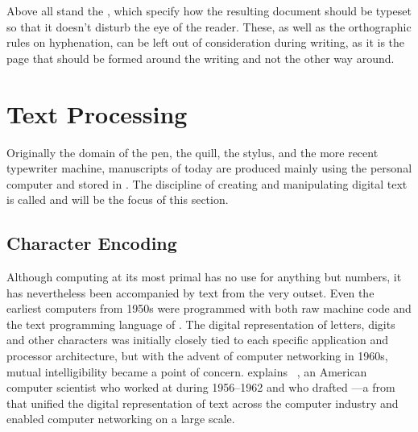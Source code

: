 Above all stand the ,
which specify how the resulting document should be typeset so that it doesn't
disturb the eye of the reader. These, as well as the orthographic rules on
hyphenation, can be left out of consideration during writing, as it is the page
that should be formed around the writing and not the other way around.

\section{Text Processing}
Originally the domain of the pen, the quill, the stylus, and the more recent
typewriter machine, manuscripts of today are produced mainly using the personal
computer and stored in . The discipline of creating and
manipulating digital text is called  and will be the focus
of this section.

\subsection{Character Encoding}
Although computing at its most primal has no use for anything but numbers, it
has nevertheless been accompanied by text from the very outset. Even the
earliest computers from 1950s were programmed with both raw machine code and
the text programming language of . The digital representation
of letters, digits and other characters was initially closely tied
to each specific application and processor architecture, but with the advent of
computer networking in 1960s, mutual intelligibility became a point of concern.
 explains ~\cite{brandel99}, an American computer scientist who worked at
 during 1956--1962 and who drafted ---a
 from \citeyear{asa63} that unified the digital
representation of text across the computer industry and enabled computer
networking on a large scale.

